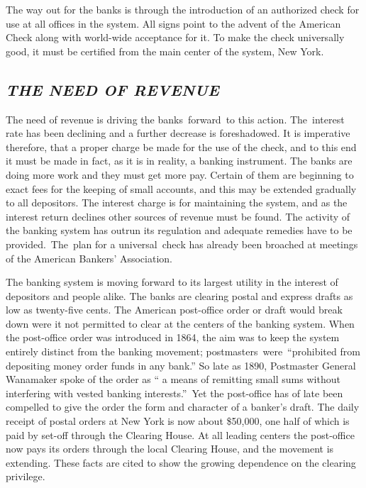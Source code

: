 \documentclass[twoside,symmetric,nobib,justified]{tufte-book}
\begin{document}
The way out for the banks is through the introduction of an authorized
check for use at all offices in the system. All signs point to the
advent of the American Check along with world-wide acceptance for it. To
make the check universally good, it must be certified from the main
center of the system, New York.~

\hypertarget{the-need-of-revenue}{%
\subsection{\texorpdfstring{\emph{THE NEED OF
REVENUE}}{THE NEED OF REVENUE}}\label{the-need-of-revenue}}

The need of revenue is driving the banks~forward~to this action.
The~interest rate has been declining and a further decrease is
foreshadowed. It is imperative therefore, that a proper charge be made
for the use of the check, and to this end it must be made in fact, as it
is in reality, a banking instrument. The banks are doing more work and
they must get more pay. Certain of them are beginning to exact fees for
the keeping of small accounts, and this may be extended gradually to all
depositors. The interest charge is for maintaining the system, and as
the interest return declines other sources of revenue must be found. The
activity of the banking system has outrun its regulation and adequate
remedies have to be provided.~The~plan for a universal~check has already
been broached at meetings of the American Bankers' Association. ~

The banking system is moving forward to its largest utility in the
interest of depositors and people alike. The banks are clearing postal
and express drafts as low as twenty-five cents. The American post-office
order or draft would break down were it not permitted to clear at the
centers of the banking system. When the post-office order was introduced
in 1864, the aim was to keep the system entirely distinct from the
banking movement; postmasters~were~``prohibited from depositing money
order funds in any bank.'' So late as 1890, Postmaster General Wanamaker
spoke of the order as `` a means of remitting small sums without
interfering with vested banking interests.''~Yet the post-office has of
late been compelled to give the order the form and character of a
banker's draft. The daily receipt of postal orders at New York is now
about \$50,000, one half of which is paid by set-off through the
Clearing House. At all leading centers the post-office now pays its
orders through the local Clearing House, and the movement is extending.
These facts are cited to show the growing dependence on the clearing
privilege.~
\end{document}
